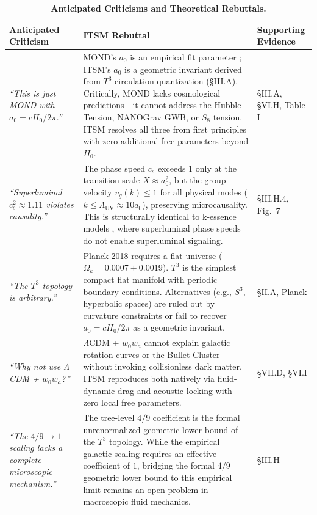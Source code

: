 \documentclass[aps,prd,10pt,twocolumn,superscriptaddress,nofootinbib,floatfix]{revtex4-2}
\begin{document}
\begin{table}[htbp]
\centering
\caption{\footnotesize \textbf{Anticipated Criticisms and Theoretical Rebuttals.}}
\label{tab:criticisms}
\renewcommand{\arraystretch}{1.3}
\scriptsize
\begin{tabular}{p{} p{} p{}}
\toprule
\textbf{Anticipated Criticism} & \textbf{ITSM Rebuttal} & \textbf{Supporting Evidence} \\
\midrule
\textit{``This is just MOND with $a_0 = c H_0 / 2\pi$.''} & MOND's $a_0$ is an empirical fit parameter \cite{mond}; ITSM's $a_0$ is a geometric invariant derived from $T^3$ circulation quantization (\S III.A). Critically, MOND lacks cosmological predictions---it cannot address the Hubble Tension, NANOGrav GWB, or $S_8$ tension. ITSM resolves all three from first principles with zero additional free parameters beyond $H_0$. & \S III.A, \S VI.H, Table I \\
\textit{``Superluminal $c_s^2 \approx 1.11$ violates causality.''} & The phase speed $c_s$ exceeds $1$ only at the transition scale $X \approx a_0^2$, but the group velocity $v_g(k) \le 1$ for all physical modes ($k \le \Lambda_{\text{UV}} \approx 10a_0$), preserving microcausality. This is structurally identical to k-essence models \cite{babichev_cs2}, where superluminal phase speeds do not enable superluminal signaling. & \S III.H.4, Fig.~7 \\
\textit{``The $T^3$ topology is arbitrary.''} & Planck 2018 requires a flat universe ($\Omega_k = 0.0007 \pm 0.0019$). $T^3$ is the simplest compact flat manifold with periodic boundary conditions. Alternatives (e.g., $S^3$, hyperbolic spaces) are ruled out by curvature constraints or fail to recover $a_0 = c H_0 / 2\pi$ as a geometric invariant. & \S II.A, Planck \cite{planck} \\
\textit{``Why not use $\Lambda$CDM + $w_0 w_a$?''} & $\Lambda$CDM + $w_0 w_a$ cannot explain galactic rotation curves or the Bullet Cluster without invoking collisionless dark matter. ITSM reproduces both natively via fluid-dynamic drag and acoustic locking with zero local free parameters. & \S VII.D, \S VI.I \\
\textit{``The $4/9 \to 1$ scaling lacks a complete microscopic mechanism.''} & The tree-level $4/9$ coefficient is the formal unrenormalized geometric lower bound of the $T^3$ topology. While the empirical galactic scaling requires an effective coefficient of $1$, bridging the formal $4/9$ geometric lower bound to this empirical limit remains an open problem in macroscopic fluid mechanics. & \S III.H \\

\end{tabular}
\end{table}
\end{document}
